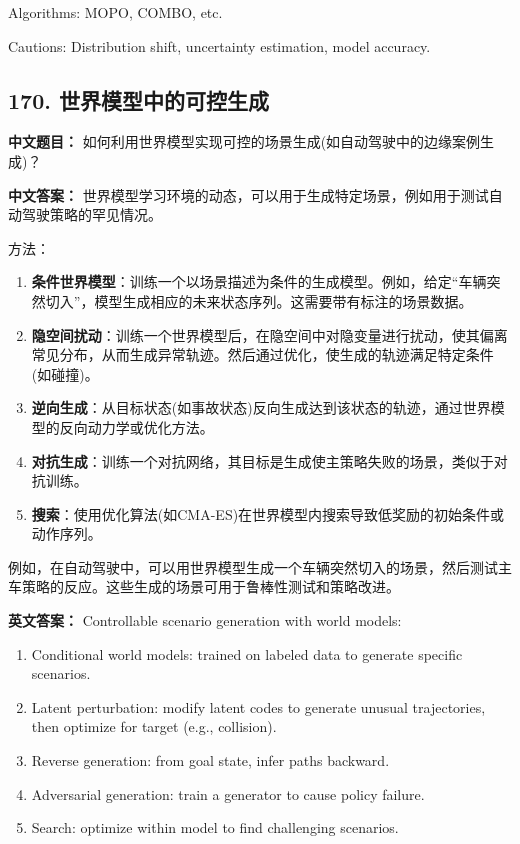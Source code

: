 \documentclass[10pt,a4paper]{ctexart}
\begin{document}
Algorithms: MOPO, COMBO, etc.

Cautions: Distribution shift, uncertainty estimation, model accuracy.

\subsection*{170. 世界模型中的可控生成}
\textbf{中文题目：} 如何利用世界模型实现可控的场景生成(如自动驾驶中的边缘案例生成)？

\textbf{中文答案：}  
世界模型学习环境的动态，可以用于生成特定场景，例如用于测试自动驾驶策略的罕见情况。

方法：
\begin{enumerate}
    \item \textbf{条件世界模型}：训练一个以场景描述为条件的生成模型。例如，给定“车辆突然切入”，模型生成相应的未来状态序列。这需要带有标注的场景数据。
    \item \textbf{隐空间扰动}：训练一个世界模型后，在隐空间中对隐变量进行扰动，使其偏离常见分布，从而生成异常轨迹。然后通过优化，使生成的轨迹满足特定条件(如碰撞)。
    \item \textbf{逆向生成}：从目标状态(如事故状态)反向生成达到该状态的轨迹，通过世界模型的反向动力学或优化方法。
    \item \textbf{对抗生成}：训练一个对抗网络，其目标是生成使主策略失败的场景，类似于对抗训练。
    \item \textbf{搜索}：使用优化算法(如CMA-ES)在世界模型内搜索导致低奖励的初始条件或动作序列。
\end{enumerate}

例如，在自动驾驶中，可以用世界模型生成一个车辆突然切入的场景，然后测试主车策略的反应。这些生成的场景可用于鲁棒性测试和策略改进。

\textbf{英文答案：}  
Controllable scenario generation with world models:

\begin{enumerate}
    \item Conditional world models: trained on labeled data to generate specific scenarios.
    \item Latent perturbation: modify latent codes to generate unusual trajectories, then optimize for target (e.g., collision).
    \item Reverse generation: from goal state, infer paths backward.
    \item Adversarial generation: train a generator to cause policy failure.
    \item Search: optimize within model to find challenging scenarios.
\end{enumerate}
\end{document}
